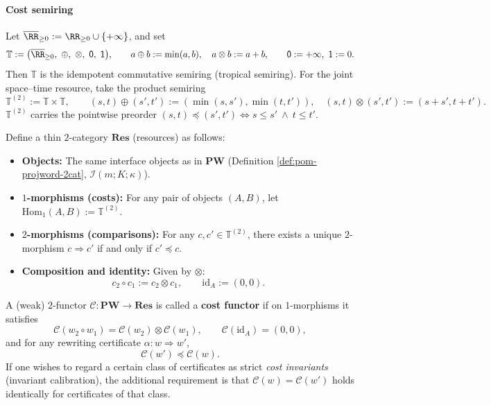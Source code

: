 \paragraph{Cost semiring}
Let \(\overline{\RR}_{\ge 0}:=\RR_{\ge 0}\cup\{+\infty\}\), and set
$$
\mathbb{T}:=\bigl(\overline{\RR}_{\ge 0},\ \oplus,\ \otimes,\ \mathsf 0,\ \mathsf 1\bigr),
\qquad
a\oplus b:=\min(a,b),\quad a\otimes b:=a+b,
\qquad
\mathsf 0:=+\infty,\ \mathsf 1:=0.
$$
Then \(\mathbb{T}\) is the idempotent commutative semiring (tropical semiring). For the joint space--time resource, take the product semiring
$$
\mathbb{T}^{(2)}:=\mathbb{T}\times \mathbb{T},
\qquad
(s,t)\oplus(s',t'):=(\min(s,s'),\min(t,t')),
\quad
(s,t)\otimes(s',t'):=(s+s',t+t').
$$
\(\mathbb{T}^{(2)}\) carries the pointwise preorder \((s,t)\preceq(s',t')\iff s\le s'\ \wedge\ t\le t'\).

\begin{definition}\label{def:pom-cost-functor}
Define a thin \(2\)-category \(\mathbf{Res}\) (resources) as follows:
\begin{itemize}
  \item \textbf{Objects:} The same interface objects as in \(\mathbf{PW}\) (Definition \ref{def:pom-projword-2cat}, \(\mathcal{I}(m;K;\kappa)\)).
  \item \textbf{\(1\)-morphisms (costs):} For any pair of objects \((A,B)\), let \(\mathrm{Hom}_1(A,B):=\mathbb{T}^{(2)}\).
  \item \textbf{\(2\)-morphisms (comparisons):} For any \(c,c'\in\mathbb{T}^{(2)}\), there exists a unique \(2\)-morphism
  \(
  c\Rightarrow c'
  \)
  if and only if \(c'\preceq c\).
  \item \textbf{Composition and identity:} Given by \(\otimes\):
  \[
  c_2\circ c_1:=c_2\otimes c_1,
  \qquad
  \mathrm{id}_A:=(0,0).
  \]
\end{itemize}
A (weak) \(2\)-functor \(\mathcal{C}:\mathbf{PW}\to \mathbf{Res}\) is called a \textbf{cost functor} if on \(1\)-morphisms it satisfies
\[
\mathcal{C}(w_2\circ w_1)=\mathcal{C}(w_2)\otimes \mathcal{C}(w_1),
\qquad
\mathcal{C}(\mathrm{id}_A)=(0,0),
\]
and for any rewriting certificate \(\alpha:w\Rightarrow w'\),
\[
\mathcal{C}(w')\preceq \mathcal{C}(w).
\]
If one wishes to regard a certain class of certificates as strict \emph{cost invariants} (invariant calibration), the additional requirement is that \(\mathcal{C}(w)=\mathcal{C}(w')\) holds identically for certificates of that class.
\end{definition}

